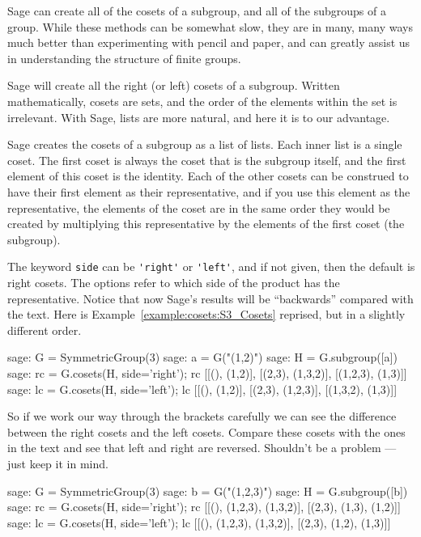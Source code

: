 Sage can create all of the cosets of a subgroup, and all of the subgroups of a group.  While these methods can be somewhat slow, they are in many, many ways much better than experimenting with pencil and paper, and can greatly assist us in understanding the structure of finite groups.\par
%
%
Sage will create all the right (or left) cosets of a subgroup.  Written mathematically, cosets are sets, and the order of the elements within the set is irrelevant.  With Sage, lists are more natural, and here it is to our advantage.\par
%
Sage creates the cosets of a subgroup as a list of lists.  Each inner list is a single coset.  The first coset is always the coset that is the subgroup itself, and the first element of this coset is the identity.  Each of the other cosets can be construed to have their first element as their representative, and if you use this element as the representative, the elements of the coset are in the same order they would be created by multiplying this representative by the elements of the first coset (the subgroup).\par
%
The keyword \verb?side? can be \verb?'right'? or \verb?'left'?, and if not given, then the default is right cosets.  The options refer to which side of the product has the representative.  Notice that now Sage's results will be ``backwards'' compared with the text.  Here is Example~\ref{example:cosets:S3_Cosets} reprised, but in a slightly different order.
%
\begin{sageexample}
sage: G = SymmetricGroup(3)
sage: a = G("(1,2)")
sage: H = G.subgroup([a])
sage: rc = G.cosets(H, side='right'); rc
[[(), (1,2)], [(2,3), (1,3,2)], [(1,2,3), (1,3)]]
sage: lc = G.cosets(H, side='left'); lc
[[(), (1,2)], [(2,3), (1,2,3)], [(1,3,2), (1,3)]]
\end{sageexample}
%
So if we work our way through the brackets carefully we can see the difference between the right cosets and the left cosets.  Compare these cosets with the ones in the text and see that left and right are reversed.  Shouldn't be a problem --- just keep it in mind.
%
\begin{sageexample}
sage: G = SymmetricGroup(3)
sage: b = G("(1,2,3)")
sage: H = G.subgroup([b])
sage: rc = G.cosets(H, side='right'); rc
[[(), (1,2,3), (1,3,2)], [(2,3), (1,3), (1,2)]]
sage: lc = G.cosets(H, side='left'); lc
[[(), (1,2,3), (1,3,2)], [(2,3), (1,2), (1,3)]]
\end{sageexample}
